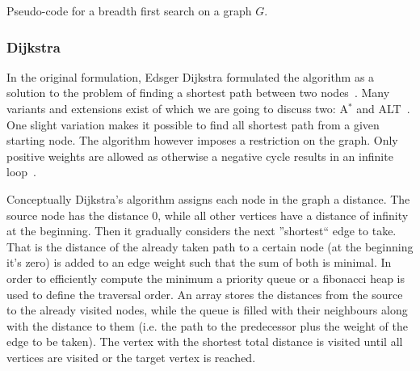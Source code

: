        \begin{algorithm}[htp]
            \hrulealg
        \caption{Pseudo-code for a breadth first search on a graph $G$.}\label{bfs}
        \end{algorithm}
        
        \subsubsection*{Dijkstra} In the original formulation, Edsger Dijkstra formulated the algorithm as a solution to the problem of finding a shortest path between two nodes~\autocite{dijkstra1959note}. 
        Many variants and extensions exist of which we are going to discuss two: A$^*$ and ALT~\autocite{hart1968formal, goldberg2005computing}. 
        One slight variation makes it possible to find all shortest path from a given starting node.
        The algorithm however imposes a restriction on the graph.
        Only positive weights are allowed as otherwise a negative cycle results in an infinite loop~\autocite{cormen2009introduction}. 
        
        Conceptually Dijkstra's algorithm assigns each node in the graph a distance. 
        The source node has the distance 0, while all other vertices have a distance of infinity at the beginning.
        Then it gradually considers the next ''shortest`` edge to take.
        That is the distance of the already taken path to a certain node (at the beginning it's zero) is added to an edge weight such that the sum of both is minimal. 
        In order to efficiently compute the minimum a priority queue or a fibonacci heap is used to define the traversal order. 
        An array stores the distances from the source to the already visited nodes, while the queue is filled with their neighbours along with the distance to them (i.e. the path to the predecessor plus the weight of the edge to be taken). 
        The vertex with the shortest total distance is visited until all vertices are visited or the target vertex is reached.
        
